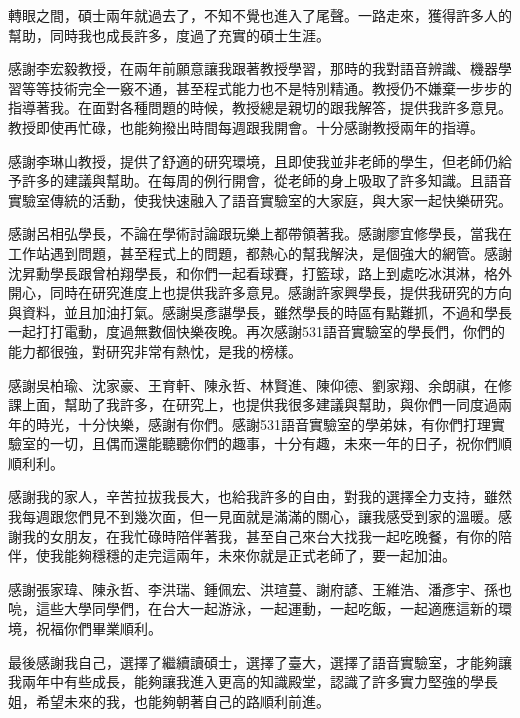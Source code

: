 \NTUtitlepage  %

\newpage
\setcounter{page}{1}

\NTUoralpage  %

\mydoublespacing
\begin{acknowledgement} %
轉眼之間，碩士兩年就過去了，不知不覺也進入了尾聲。一路走來，獲得許多人的幫助，同時我也成長許多，度過了充實的碩士生涯。

感謝李宏毅教授，在兩年前願意讓我跟著教授學習，那時的我對語音辨識、機器學習等等技術完全一竅不通，甚至程式能力也不是特別精通。教授仍不嫌棄一步步的指導著我。在面對各種問題的時候，教授總是親切的跟我解答，提供我許多意見。教授即使再忙碌，也能夠撥出時間每週跟我開會。十分感謝教授兩年的指導。

感謝李琳山教授，提供了舒適的研究環境，且即使我並非老師的學生，但老師仍給予許多的建議與幫助。在每周的例行開會，從老師的身上吸取了許多知識。且語音實驗室傳統的活動，使我快速融入了語音實驗室的大家庭，與大家一起快樂研究。

感謝呂相弘學長，不論在學術討論跟玩樂上都帶領著我。感謝廖宜修學長，當我在工作站遇到問題，甚至程式上的問題，都熱心的幫我解決，是個強大的網管。感謝沈昇勳學長跟曾柏翔學長，和你們一起看球賽，打籃球，路上到處吃冰淇淋，格外開心，同時在研究進度上也提供我許多意見。感謝許家興學長，提供我研究的方向與資料，並且加油打氣。感謝吳彥諶學長，雖然學長的時區有點難抓，不過和學長一起打打電動，度過無數個快樂夜晚。再次感謝531語音實驗室的學長們，你們的能力都很強，對研究非常有熱忱，是我的榜樣。

感謝吳柏瑜、沈家豪、王育軒、陳永哲、林賢進、陳仰德、劉家翔、余朗祺，在修課上面，幫助了我許多，在研究上，也提供我很多建議與幫助，與你們一同度過兩年的時光，十分快樂，感謝有你們。感謝531語音實驗室的學弟妹，有你們打理實驗室的一切，且偶而還能聽聽你們的趣事，十分有趣，未來一年的日子，祝你們順順利利。

感謝我的家人，辛苦拉拔我長大，也給我許多的自由，對我的選擇全力支持，雖然我每週跟您們見不到幾次面，但一見面就是滿滿的關心，讓我感受到家的溫暖。感謝我的女朋友，在我忙碌時陪伴著我，甚至自己來台大找我一起吃晚餐，有你的陪伴，使我能夠穩穩的走完這兩年，未來你就是正式老師了，要一起加油。

感謝張家瑋、陳永哲、李洪瑞、鍾佩宏、洪瑄蔓、謝府諺、王維浩、潘彥宇、孫也喨，這些大學同學們，在台大一起游泳，一起運動，一起吃飯，一起適應這新的環境，祝福你們畢業順利。

最後感謝我自己，選擇了繼續讀碩士，選擇了臺大，選擇了語音實驗室，才能夠讓我兩年中有些成長，能夠讓我進入更高的知識殿堂，認識了許多實力堅強的學長姐，希望未來的我，也能夠朝著自己的路順利前進。
\end{acknowledgement}

